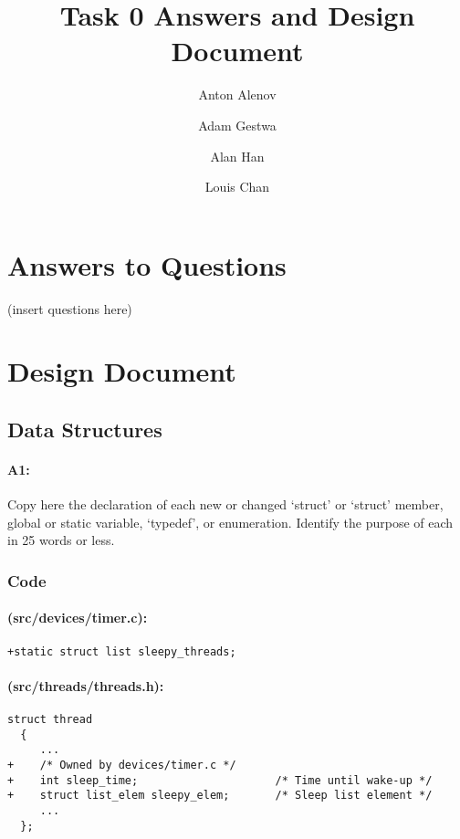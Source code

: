 \documentclass[11pt]{article}
\begin{document}
\title{Task 0 Answers and Design Document}
\author{Anton Alenov \and Adam Gestwa \and Alan Han \and Louis Chan}

\maketitle

\section{Answers to Questions}
(insert questions here)

\section{Design Document}

\subsection{Data Structures}
\paragraph{A1:}
Copy here the declaration of each new or changed ‘struct’ or ‘struct’ member, global or static variable, ‘typedef’, or enumeration. Identify the purpose of each in 25 words or less.
\subsubsection{Code}

\paragraph{(src/devices/timer.c):}

\begin{verbatim}
+static struct list sleepy_threads;
\end{verbatim}

\paragraph{(src/threads/threads.h):}

\begin{verbatim}
struct thread
  {
     ...
+    /* Owned by devices/timer.c */
+    int sleep_time;                     /* Time until wake-up */
+    struct list_elem sleepy_elem;       /* Sleep list element */
     ...
  };

\end{verbatim}
\end{document}
